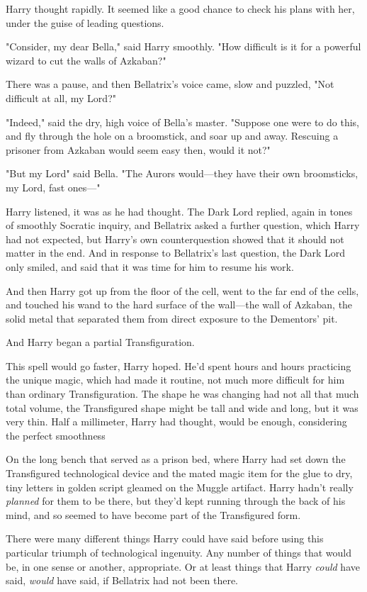 Harry thought rapidly. It seemed like a good chance to check his plans with
her, under the guise of leading questions.

"Consider, my dear Bella," said Harry smoothly. "How difficult is it for a
powerful wizard to cut the walls of Azkaban?"

There was a pause, and then Bellatrix's voice came, slow and puzzled, "Not
difficult at all, my Lord\el?"

"Indeed," said the dry, high voice of Bella's master. "Suppose one were to do
this, and fly through the hole on a broomstick, and soar up and away. Rescuing
a prisoner from Azkaban would seem easy then, would it not?"

"But my Lord{\el}" said Bella. "The Aurors would---they have their own
broomsticks, my Lord, fast ones\mbox{---}"

Harry listened, it was as he had thought. The Dark Lord replied, again in tones
of smoothly Socratic inquiry, and Bellatrix asked a further question, which
Harry had not expected, but Harry's own counterquestion showed that it should
not matter in the end. And in response to Bellatrix's last question, the Dark
Lord only smiled, and said that it was time for him to resume his work.

And then Harry got up from the floor of the cell, went to the far end of the
cells, and touched his wand to the hard surface of the wall---the wall of
Azkaban, the solid metal that separated them from direct exposure to the
Dementors' pit.

And Harry began a partial Transfiguration.

This spell would go faster, Harry hoped. He'd spent hours and hours practicing
the unique magic, which had made it routine, not much more difficult for him
than ordinary Transfiguration. The shape he was changing had not all that much
total volume, the Transfigured shape might be tall and wide and long, but it
was very thin. Half a millimeter, Harry had thought, would be enough,
considering the perfect smoothness{\el}

On the long bench that served as a prison bed, where Harry had set down the
Transfigured technological device and the mated magic item for the glue to dry,
tiny letters in golden script gleamed on the Muggle artifact. Harry hadn't
really \emph{planned} for them to be there, but they'd kept running through the
back of his mind, and so seemed to have become part of the Transfigured form.

There were many different things Harry could have said before using this
particular triumph of technological ingenuity. Any number of things that would
be, in one sense or another, appropriate. Or at least things that Harry
\emph{could} have said, \emph{would} have said, if Bellatrix had not been there.

